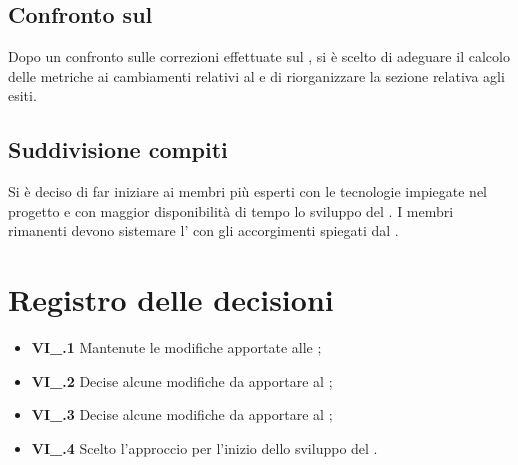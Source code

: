 \subsection{Confronto sul \PdQ}
Dopo un confronto sulle correzioni effettuate sul \PdQ{}, si è scelto di adeguare il calcolo delle metriche ai cambiamenti relativi al \PdP{} e di riorganizzare la sezione relativa agli esiti.
\subsection{Suddivisione compiti}
Si è deciso di far iniziare ai membri più esperti con le tecnologie impiegate nel progetto e con maggior disponibilità di tempo lo sviluppo del . I membri rimanenti devono sistemare l'\AdR{} con gli accorgimenti spiegati dal \CR{}.

\section{Registro delle decisioni}
\begin{itemize}
	\item \textbf{VI\_\Data.1} Mantenute le modifiche apportate alle \NdP{};
	\item \textbf{VI\_\Data.2} Decise alcune modifiche da apportare al \PdP{};
	\item \textbf{VI\_\Data.3} Decise alcune modifiche da apportare al \PdQ{};
	\item \textbf{VI\_\Data.4} Scelto l'approccio per l'inizio dello sviluppo del .
\end{itemize}